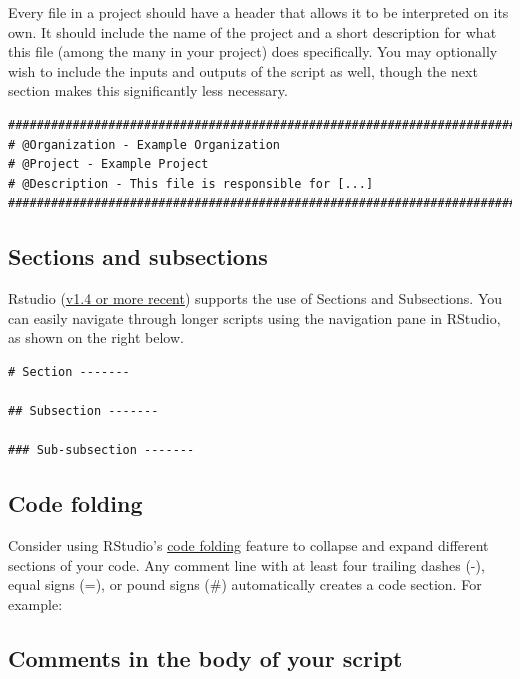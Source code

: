 \documentclass[
]{book}
\begin{document}
Every file in a project should have a header that allows it to be interpreted on its own. It should include the name of the project and a short description for what this file (among the many in your project) does specifically. You may optionally wish to include the inputs and outputs of the script as well, though the next section makes this significantly less necessary.

\begin{verbatim}
################################################################################
# @Organization - Example Organization
# @Project - Example Project
# @Description - This file is responsible for [...]
################################################################################
\end{verbatim}

\hypertarget{sections-and-subsections}{%
\subsection{Sections and subsections}\label{sections-and-subsections}}

Rstudio (\href{https://blog.rstudio.com/2020/12/02/rstudio-v1-4-preview-little-things/}{v1.4 or more recent}) supports the use of Sections and Subsections. You can easily navigate through longer scripts using the navigation pane in RStudio, as shown on the right below.

\begin{verbatim}
# Section -------

## Subsection -------

### Sub-subsection -------
\end{verbatim}

\hypertarget{code-folding}{%
\subsection{Code folding}\label{code-folding}}

Consider using RStudio's \href{https://support.rstudio.com/hc/en-us/articles/200484568-Code-Folding-and-Sections}{code folding} feature to collapse and expand different sections of your code. Any comment line with at least four trailing dashes (-), equal signs (=), or pound signs (\#) automatically creates a code section. For example:

\hypertarget{comments-in-the-body-of-your-script}{%
\subsection{Comments in the body of your script}\label{comments-in-the-body-of-your-script}}
\end{document}
